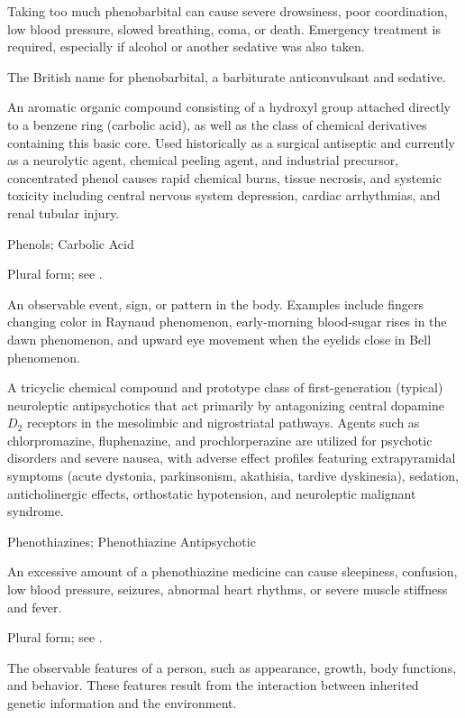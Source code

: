 Taking too much phenobarbital can cause severe drowsiness, poor coordination, low blood pressure, slowed breathing, coma, or death. Emergency treatment is required, especially if alcohol or another sedative was also taken.

 The British name for phenobarbital, a barbiturate anticonvulsant and sedative.

 An aromatic organic compound consisting of a hydroxyl group attached directly to a benzene ring (carbolic acid), as well as the class of chemical derivatives containing this basic core. Used historically as a surgical antiseptic and currently as a neurolytic agent, chemical peeling agent, and industrial precursor, concentrated phenol causes rapid chemical burns, tissue necrosis, and systemic toxicity including central nervous system depression, cardiac arrhythmias, and renal tubular injury.

\synonyms
Phenols; Carbolic Acid

 Plural form; see .

 An observable event, sign, or pattern in the body. Examples include fingers changing color in Raynaud phenomenon, early-morning blood-sugar rises in the dawn phenomenon, and upward eye movement when the eyelids close in Bell phenomenon.

 A tricyclic chemical compound and prototype class of first-generation (typical) neuroleptic antipsychotics that act primarily by antagonizing central dopamine $D_2$ receptors in the mesolimbic and nigrostriatal pathways. Agents such as chlorpromazine, fluphenazine, and prochlorperazine are utilized for psychotic disorders and severe nausea, with adverse effect profiles featuring extrapyramidal symptoms (acute dystonia, parkinsonism, akathisia, tardive dyskinesia), sedation, anticholinergic effects, orthostatic hypotension, and neuroleptic malignant syndrome.

\synonyms
Phenothiazines; Phenothiazine Antipsychotic

 An excessive amount of a phenothiazine medicine can cause sleepiness, confusion, low blood pressure, seizures, abnormal heart rhythms, or severe muscle stiffness and fever.

 Plural form; see .

 The observable features of a person, such as appearance, growth, body functions, and behavior. These features result from the interaction between inherited genetic information and the environment.

